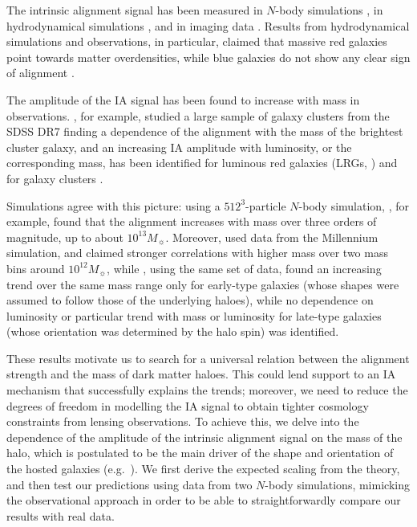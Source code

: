 \documentclass[a4paper,fleqn,usenatbib]{mnras}
\begin{document}
The intrinsic alignment signal has been measured in $N$-body simulations \citep{Heymansetal2006, Kuhlenetal2007, Leeetal2008, Schneideretal2012, Joachimietal2013a, Joachimietal2013b}, in hydrodynamical simulations \citep{Codisetal2015, Velliscigetal2015b, Chisarietal2015, Tennetietal2016, Hilbertetal2017}, and in imaging data \citep{Joachimietal2011, Haoetal2011, Lietal2013, Singhetal2015, vanUitertJoachimi2017}. Results from hydrodynamical simulations and observations, in particular, claimed that massive red galaxies point towards matter overdensities, while blue galaxies do not show any clear sign of alignment \citep{Hirataetal2007, Mandelbaumetal2011}. 

The amplitude of the IA signal has been found to increase with mass in observations. \citet{Haoetal2011}, for example, studied a large sample of galaxy clusters from the SDSS DR7 finding a dependence of the alignment with the mass of the brightest cluster galaxy, and an increasing IA amplitude with luminosity, or the corresponding mass, has been identified for luminous red galaxies (LRGs, \citealt{Joachimietal2011, Singhetal2015}) and for galaxy clusters \citep{vanUitertJoachimi2017}. 

Simulations agree with this picture: using a $512^3$-particle $N$-body simulation, \citet{Jing2002}, for example, found that the alignment increases with mass over three orders of magnitude, up to about $10^{13} M_{\sun}$. Moreover, \citet{Leeetal2008} used data from the Millennium simulation, and claimed stronger correlations with higher mass over two mass bins around $10^{12} M_{\sun}$, while \citet{Joachimietal2013b}, using the same set of data, found an increasing trend over the same mass range only for early-type galaxies (whose shapes were assumed to follow those of the underlying haloes), while no dependence on luminosity or particular trend with mass or luminosity for late-type galaxies (whose orientation was determined by the halo spin) was identified. 

These results motivate us to search for a universal relation between the alignment strength and the mass of dark matter haloes. This could lend support to an IA mechanism that successfully explains the trends; moreover, we need to reduce the degrees of freedom in modelling the IA signal to obtain tighter cosmology constraints from lensing observations. To achieve this, we delve into the dependence of the amplitude of the intrinsic alignment signal on the mass of the halo, which is postulated to be the main driver of the shape and orientation of the hosted galaxies (e.g.\ \citealt{Joachimietal2015}). We first derive the expected scaling from the theory, and then test our predictions using data from two $N$-body simulations, mimicking the observational approach in order to be able to straightforwardly compare our results with real data.
\end{document}
